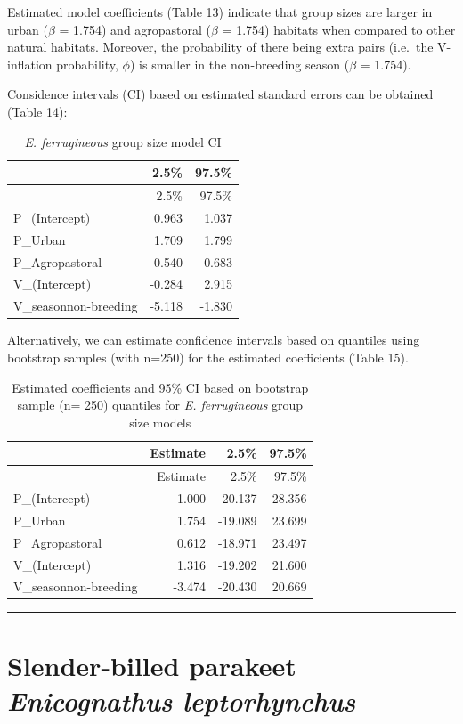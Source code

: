 \documentclass[]{article}
\begin{document}
Estimated model coefficients (Table 13) indicate that group sizes are
larger in urban (\(\beta\) = 1.754) and agropastoral (\(\beta\) = 1.754)
habitats when compared to other natural habitats. Moreover, the
probability of there being extra pairs (i.e.~the V-inflation
probability, \(\phi\)) is smaller in the non-breeding season (\(\beta\)
= 1.754).

Considence intervals (CI) based on estimated standard errors can be
obtained (Table 14):

\begin{longtable}[]{@{}lrr@{}}
\caption{\textit{E. ferrugineous} group size model CI}\tabularnewline
\toprule
& 2.5\% & 97.5\%\tabularnewline
\midrule
\endfirsthead
\toprule
& 2.5\% & 97.5\%\tabularnewline
\midrule
\endhead
P\_(Intercept) & 0.963 & 1.037\tabularnewline
P\_Urban & 1.709 & 1.799\tabularnewline
P\_Agropastoral & 0.540 & 0.683\tabularnewline
V\_(Intercept) & -0.284 & 2.915\tabularnewline
V\_seasonnon-breeding & -5.118 & -1.830\tabularnewline
\bottomrule
\end{longtable}

Alternatively, we can estimate confidence intervals based on quantiles
using bootstrap samples (with n=250) for the estimated coefficients
(Table 15).

\begin{longtable}[]{@{}lrrr@{}}
\caption{Estimated coefficients and 95\% CI based on bootstrap sample
(n= 250) quantiles for \textit{E. ferrugineous} group size
models}\tabularnewline
\toprule
& Estimate & 2.5\% & 97.5\%\tabularnewline
\midrule
\endfirsthead
\toprule
& Estimate & 2.5\% & 97.5\%\tabularnewline
\midrule
\endhead
P\_(Intercept) & 1.000 & -20.137 & 28.356\tabularnewline
P\_Urban & 1.754 & -19.089 & 23.699\tabularnewline
P\_Agropastoral & 0.612 & -18.971 & 23.497\tabularnewline
V\_(Intercept) & 1.316 & -19.202 & 21.600\tabularnewline
V\_seasonnon-breeding & -3.474 & -20.430 & 20.669\tabularnewline
\bottomrule
\end{longtable}

\begin{center}\rule{0.5\linewidth}{\linethickness}\end{center}

\section{\texorpdfstring{Slender-billed parakeet \emph{Enicognathus
leptorhynchus}}{Slender-billed parakeet Enicognathus leptorhynchus}}\label{slender-billed-parakeet-enicognathus-leptorhynchus}
\end{document}
